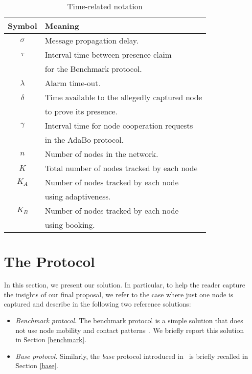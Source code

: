 \documentclass{IEEEconf}
\begin{document}
\begin{table}
\begin{center}
\begin{footnotesize}
\caption{Time-related notation}
\vspace{0.3cm}
\centering
\begin{tabular}{cl}
\hline
\textbf{Symbol} & \textbf{Meaning} \\
    \hline\hline
$\sigma$ & Message propagation delay. \\
    \hline
$\tau$ & Interval time between presence claim\\
       & for the Benchmark protocol. \\
    \hline
$\lambda$ & Alarm time-out.\\ \hline
$\delta$ & Time available to the allegedly captured node \\
         & to prove its presence.  \\ \hline
$\gamma$ & Interval time for node cooperation requests \\
	& in the AdaBo protocol. \\
\hline
$n$ & Number of nodes in the network. \\
    \hline
$K$ & Total number of nodes tracked by each node\\
\hline
$K_A$ & Number of nodes tracked by each node\\
      & using adaptiveness.\\\hline
$K_B$ & Number of nodes tracked by each node\\
      & using booking.\\\hline
\end{tabular}
\label{tabella_notazione}
\end{footnotesize}
\end{center}
\end{table}














\section{The Protocol}
\label{theprotocol}

In this section, we present our solution.
In particular, to help the reader capture the insights of our final proposal,
we refer to the case where just one node is captured and describe in the following two reference solutions:
\begin{itemize}
\item \textit{Benchmark protocol.} The benchmark protocol is a simple solution that does not use node mobility and contact patterns~\cite{CDMM:EURASIP:2009}. We briefly report this solution in Section \ref{benchmark}.
\item \textit{Base protocol.} Similarly, the
 {\em base} protocol introduced in~\cite{CDMM:WiSec08:Emergent, CDMM:EURASIP:2009}
is briefly recalled in Section \ref{base}.
\end{itemize}
\end{document}
